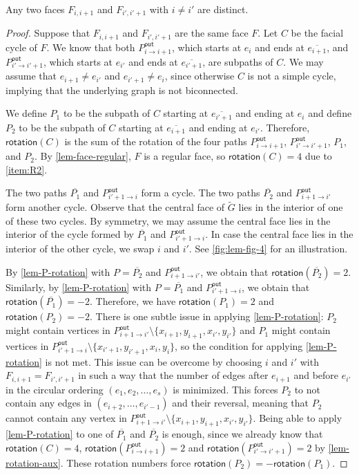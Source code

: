 \documentclass{article}\usepackage[a4paper,margin=20mm]{geometry}
\newcommand{\Pout}{P^{\mathsf{out}}}
\newcommand{\rotation}{\mathsf{rotation}}
\begin{document}
\begin{lemma}\label{lem-face-distinct}
Any two faces $F_{i,i+1}$ and $F_{i',i'+1}$ with $i \neq i'$ are distinct. 
\end{lemma}
\begin{proof}
Suppose that $F_{i,i+1}$ and $F_{i',i'+1}$ are the same face $F$. Let $C$ be the facial cycle of $F$. We know that both $\Pout_{i \rightarrow i+1}$, which starts at $e_i$ and ends at $\overline{e_{i+1}}$, and $\Pout_{i' \rightarrow i'+1}$, which starts at $e_{i'}$ and ends at $\overline{e_{i'+1}}$, are subpaths of $C$. We may assume that $e_{i+1} \neq e_{i'}$ and $e_{i'+1} \neq e_i$, since otherwise $C$ is not a simple cycle, implying that the underlying graph is not biconnected.


We define $P_1$ to be the subpath of $C$ starting at $\overline{e_{i'+1}}$ and ending at $e_i$ and define $P_2$ to be the subpath of $C$ starting at $\overline{e_{i+1}}$ and ending at $e_{i'}$.
Therefore, $\rotation(C)$ is the sum of the rotation of the four paths $\Pout_{i \rightarrow i+1}$, $\Pout_{i' \rightarrow i'+1}$, $P_1$, and $P_2$. By \cref{lem-face-regular}, $F$ is a regular face, so $\rotation(C)=4$ due to \ref{item:R2}. 

The two paths $\overline{P_1}$ and $\Pout_{i'+1 \rightarrow i}$ form a cycle. The two paths $\overline{P_2}$ and $\Pout_{i+1 \rightarrow i'}$ form another cycle. Observe that the central face of $\tilde{G}$ lies in the interior of one of these two cycles. By symmetry, we may assume the central face lies in the interior of the cycle formed by $\overline{P_1}$ and $\Pout_{i'+1 \rightarrow i}$. In case the central face lies in the interior of the other cycle, we swap $i$ and $i'$. See \cref{fig:lem-fig-4} for an illustration.


By \cref{lem-P-rotation} with $P = \overline{P_2}$ and $\Pout_{i+1\rightarrow i'}$, we obtain that $\rotation(\overline{P_2}) = 2$.
Similarly, by \cref{lem-P-rotation} with $P = \overline{P_1}$ and $\Pout_{i'+1\rightarrow i}$,
we obtain that  $\rotation(\overline{P_1}) = -2$.
Therefore, we have $\rotation(P_1) = 2$ and $\rotation(P_2) = -2$. There is one subtle issue in applying \cref{lem-P-rotation}:  $P_2$ might contain vertices in $\Pout_{i+1\rightarrow i'} \setminus \{x_{i+1}, y_{i+1}, x_{i'}, y_{i'}\}$ and $P_1$ might contain vertices in $\Pout_{i'+1\rightarrow i} \setminus \{x_{i'+1}, y_{i'+1}, x_{i}, y_{i}\}$, so the condition for applying  \cref{lem-P-rotation} is not met. This issue can be overcome by choosing $i$ and $i'$ with $F_{i,i+1} = F_{i',i'+1}$ in such a way that the number of edges after $e_{i+1}$ and before $e_{i'}$ in the circular ordering $(e_{1}, e_{2}, \ldots, e_{s})$ is minimized. This forces $P_2$ to not contain any edges in $(e_{i+2}, \ldots, e_{i'-1})$ and their reversal, meaning that $P_2$ cannot contain any vertex in $\Pout_{i+1\rightarrow i'} \setminus \{x_{i+1}, y_{i+1}, x_{i'}, y_{i'}\}$.  Being able to apply  \cref{lem-P-rotation} to one of $\overline{P_1}$ and $\overline{P_2}$ is enough, since we already know that $\rotation(C)=4$, $\rotation(\Pout_{i \rightarrow i+1}) = 2$ and  $\rotation(\Pout_{i' \rightarrow i'+1})=2$ by \cref{lem-rotation-aux}. These rotation numbers force $\rotation(P_2) = -\rotation(P_1)$.


\end{proof}
\end{document}
